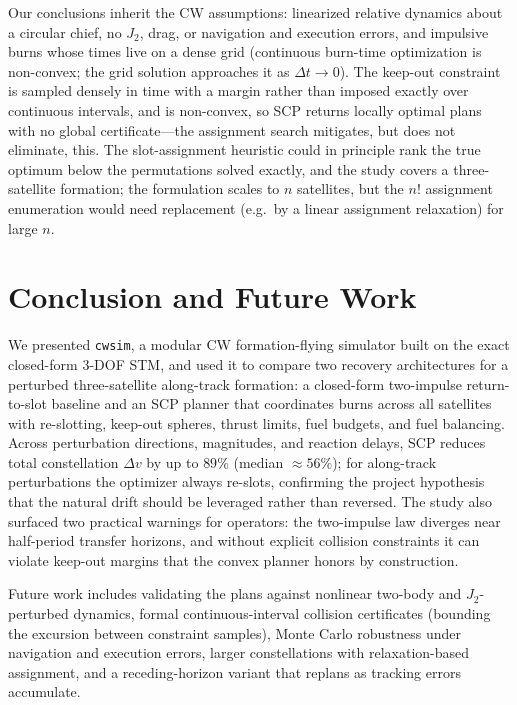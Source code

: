 \documentclass[10pt,twocolumn,letterpaper]{article}
\begin{document}
Our conclusions inherit the CW assumptions: linearized relative dynamics about
a circular chief, no $J_2$, drag, or navigation and execution errors, and
impulsive burns whose times live on a dense grid (continuous burn-time
optimization is non-convex; the grid solution approaches it as
$\Delta t \to 0$). The keep-out constraint is sampled densely in time with a
margin rather than imposed exactly over continuous intervals, and is
non-convex, so SCP returns locally optimal plans with no global
certificate---the assignment search mitigates, but does not eliminate, this. The slot-assignment heuristic
could in principle rank the true optimum below the permutations solved
exactly, and the study covers a three-satellite formation; the formulation
scales to $n$ satellites, but the $n!$ assignment enumeration would need
replacement (e.g.\ by a linear assignment relaxation) for large $n$.

\section{Conclusion and Future Work}
\label{sec:conclusion}

We presented \texttt{cwsim}, a modular CW formation-flying simulator built on
the exact closed-form 3-DOF STM, and used it to compare two recovery
architectures for a perturbed three-satellite along-track formation: a
closed-form two-impulse return-to-slot baseline and an SCP planner that
coordinates burns across all satellites with re-slotting, keep-out spheres,
thrust limits, fuel budgets, and fuel balancing. Across perturbation
directions, magnitudes, and reaction delays, SCP reduces total constellation
$\Delta v$ by up to $89\%$ (median ${\approx}56\%$); for along-track
perturbations the optimizer always
re-slots, confirming the project hypothesis that the natural drift should be
leveraged rather than reversed. The study also surfaced two practical
warnings for operators: the two-impulse law diverges near half-period
transfer horizons, and without explicit collision constraints it can violate
keep-out margins that the convex planner honors by construction.

Future work includes validating the plans against nonlinear two-body and
$J_2$-perturbed dynamics, formal continuous-interval collision certificates
(bounding the excursion between constraint samples), Monte Carlo
robustness under navigation and execution errors, larger constellations with
relaxation-based assignment, and a receding-horizon variant that replans as
tracking errors accumulate.
\end{document}
